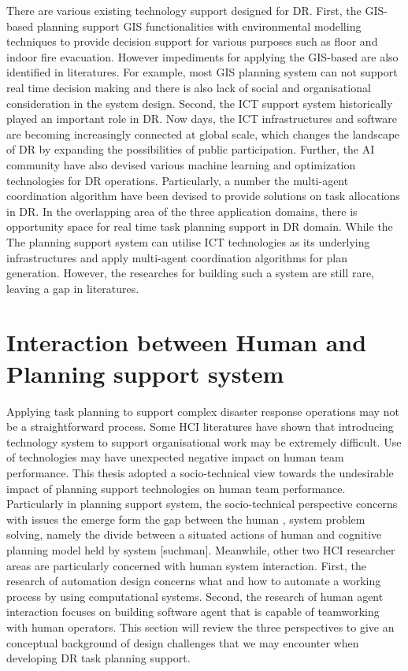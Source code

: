 There are various existing technology support designed for \ac{DR}. First, the \ac{GIS}-based planning support \ac{GIS} functionalities with environmental modelling techniques to provide decision support for various purposes such as floor and indoor fire evacuation. However impediments for applying the \ac{GIS}-based are also identified in literatures. For example, most \ac{GIS} planning system can not support real time decision making and there is also lack of social and organisational consideration in the system design. Second, the \ac{ICT} support system historically played an important role in \ac{DR}. Now days, the \ac{ICT} infrastructures and software are becoming increasingly connected at global scale, which changes the landscape of \ac{DR} by expanding the possibilities of public participation. Further, the \ac{AI} community have also devised various machine learning and optimization technologies for \ac{DR} operations. Particularly, a number the multi-agent coordination algorithm have been devised to provide solutions on task allocations in \ac{DR}. In the overlapping area of the three application domains, there is opportunity space for real time task planning support in \ac{DR} domain. While the The planning support system can utilise \ac{ICT} technologies as its underlying infrastructures and apply multi-agent coordination algorithms for plan generation. However, the researches for building such a system are still rare, leaving a gap in literatures.\\

\chapter{Interaction between Human and Planning support system}

Applying task planning to support complex disaster response operations may not be a straightforward process. Some HCI literatures \cite{Ackerman2000,Bowers1994,Niazkhani2009} have shown that introducing technology system to support organisational work may be extremely difficult. Use of technologies may have unexpected negative impact on human team performance. This thesis adopted a socio-technical view towards the undesirable impact of planning support technologies on human team performance. Particularly in planning support system, the socio-technical perspective concerns with issues the emerge form the gap between the human , system problem solving, namely the divide between a situated actions of human and cognitive planning model held by system [suchman]. Meanwhile, other two HCI researcher areas are particularly concerned with human system interaction. First, the research of automation design  concerns what and how to automate a working process by using computational systems. Second, the research of human agent interaction focuses on building software agent that is capable of teamworking with human operators. This section will review the three perspectives to give an conceptual background of design challenges that we may encounter when developing DR task planning support.\\

